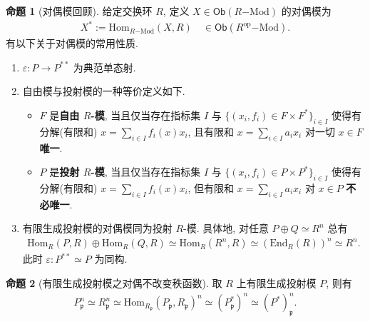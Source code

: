 \documentclass{MainStyle}
\theoremstyle{definition}
\theoremstyle{definition}
\theoremstyle{definition}
\theoremstyle{definition}
\newtheorem{proposition}{命题}
\theoremstyle{definition}
\theoremstyle{definition}
\theoremstyle{definition}
\theoremstyle{remark}
\theoremstyle{remark}
\begin{document}
\begin{proposition}[对偶模回顾]
    给定交换环 $R$, 定义 $X\in \mathsf{Ob}(R\mathrm{-Mod})$ 的对偶模为
    \begin{align*}
        X^\ast:=\mathrm{Hom}_{R\mathrm{-Mod}}(X,R)\quad \in \mathsf{Ob}(R^{\mathrm{op}}\mathrm{-Mod}).
    \end{align*}
    有以下关于对偶模的常用性质.
    \begin{enumerate}
        \item $\varepsilon: P\to P^{\ast\ast}$ 为典范单态射.
        \item 自由模与投射模的一种等价定义如下.
              \begin{itemize}
                  \item $F$ 是\textbf{自由 $R$-模}, 当且仅当存在指标集 $I$ 与 $\{(x_i,f_i)\in F\times F^\ast\}_{i\in I}$ 使得有分解(有限和) $\displaystyle x=\sum _{i\in I}f_i(x)x_i$, 且有限和 $\displaystyle x=\sum _{i\in I}a_i x_i$ 对一切 $x\in F$ \textbf{唯一}.
                  \item $P$ 是\textbf{投射 $R$-模}, 当且仅当存在指标集 $I$ 与 $\{(x_i,f_i)\in P\times P^\ast\}_{i\in I}$ 使得有分解(有限和) $\displaystyle x=\sum _{i\in I}f_i(x)x_i$, 但有限和 $\displaystyle x=\sum _{i\in I}a_i x_i$ 对 $x\in P$ \textbf{不必唯一}.
              \end{itemize}
        \item 有限生成投射模的对偶模同为投射 $R$-模. 具体地, 对任意 $P\oplus Q\simeq R^n$ 总有
              \begin{align*}
                  \mathrm{Hom}_R(P,R)\oplus \mathrm{Hom}_R(Q,R)\simeq \mathrm{Hom}_R(R^n,R)\simeq (\mathrm{End}_R(R))^n\simeq R^n.
              \end{align*}
              此时 $\varepsilon: P^{\ast\ast}\simeq P$ 为同构.
    \end{enumerate}
\end{proposition}

\begin{proposition}[有限生成投射模之对偶不改变秩函数]
    取 $R$ 上有限生成投射模 $P$, 则有
    \begin{align*}
        P_\mathfrak p^n\simeq R_\mathfrak p^n\simeq \mathrm{Hom}_{R_\mathfrak p}(P_\mathfrak p,R_\mathfrak p)^n\simeq (P^\ast_\mathfrak p)^n\simeq (P^\ast)_\mathfrak p^n.
    \end{align*}
\end{proposition}
\end{document}
